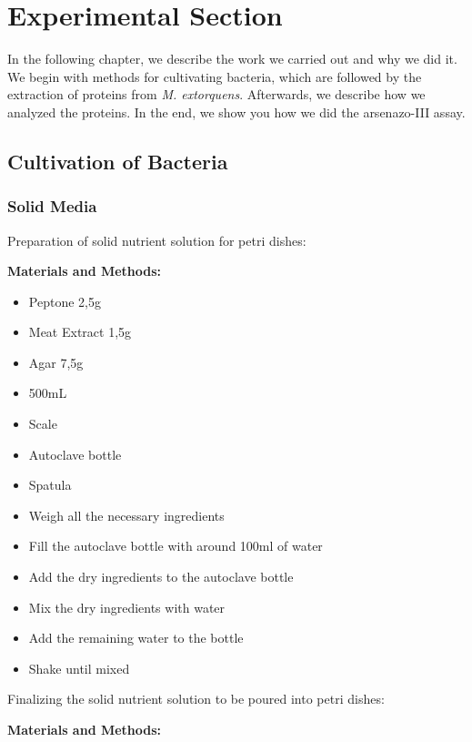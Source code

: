 \chapter{Experimental Section}

In the following chapter, we describe the work we carried out and why we did it.
We begin with methods for cultivating bacteria, which are followed by the extraction of proteins from \emph{M. extorquens}.
Afterwards, we describe how we analyzed the proteins.
In the end, we show you how we did the arsenazo-III assay.


\section{Cultivation of Bacteria\authorB}

\subsection{Solid Media}

Preparation of solid nutrient solution for petri dishes:

\textbf{Materials and Methods:}

\begin{itemize}
    \item Peptone 2,5g
    \item Meat Extract 1,5g
    \item Agar 7,5g
    \item {} 500mL
    \item Scale
    \item Autoclave bottle
    \item Spatula
    \item Weigh all the necessary ingredients
    \item Fill the autoclave bottle with around 100ml of water
    \item Add the dry ingredients to the autoclave bottle
    \item Mix the dry ingredients with water
    \item Add the remaining water to the bottle
    \item Shake until mixed
\end{itemize}

\newpage

Finalizing the solid nutrient solution to be poured into petri dishes:

\textbf{Materials and Methods:}

